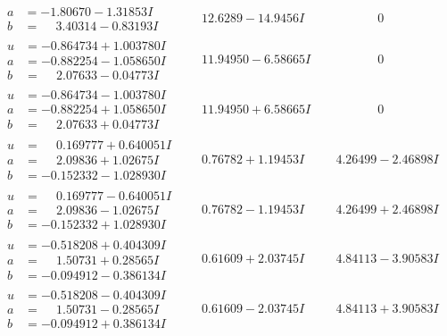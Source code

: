 \documentclass[1p]{elsarticle_modified}
\theoremstyle{definition}
\begin{document}
$$\begin{array}{c|c|c}
\begin{aligned}
a &= -1.80670 - 1.31853 I \\
b &= \phantom{-}3.40314 - 0.83193 I\end{aligned}
 & \phantom{-}12.6289 - 14.9456 I & \phantom{-0.000000 } 0 \\ \hline\begin{aligned}
u &= -0.864734 + 1.003780 I \\
a &= -0.882254 - 1.058650 I \\
b &= \phantom{-}2.07633 - 0.04773 I\end{aligned}
 & \phantom{-}11.94950 - 6.58665 I & \phantom{-0.000000 } 0 \\ \hline\begin{aligned}
u &= -0.864734 - 1.003780 I \\
a &= -0.882254 + 1.058650 I \\
b &= \phantom{-}2.07633 + 0.04773 I\end{aligned}
 & \phantom{-}11.94950 + 6.58665 I & \phantom{-0.000000 } 0 \\ \hline\begin{aligned}
u &= \phantom{-}0.169777 + 0.640051 I \\
a &= \phantom{-}2.09836 + 1.02675 I \\
b &= -0.152332 - 1.028930 I\end{aligned}
 & \phantom{-}0.76782 + 1.19453 I & \phantom{-}4.26499 - 2.46898 I \\ \hline\begin{aligned}
u &= \phantom{-}0.169777 - 0.640051 I \\
a &= \phantom{-}2.09836 - 1.02675 I \\
b &= -0.152332 + 1.028930 I\end{aligned}
 & \phantom{-}0.76782 - 1.19453 I & \phantom{-}4.26499 + 2.46898 I \\ \hline\begin{aligned}
u &= -0.518208 + 0.404309 I \\
a &= \phantom{-}1.50731 + 0.28565 I \\
b &= -0.094912 - 0.386134 I\end{aligned}
 & \phantom{-}0.61609 + 2.03745 I & \phantom{-}4.84113 - 3.90583 I \\ \hline\begin{aligned}
u &= -0.518208 - 0.404309 I \\
a &= \phantom{-}1.50731 - 0.28565 I \\
b &= -0.094912 + 0.386134 I\end{aligned}
 & \phantom{-}0.61609 - 2.03745 I & \phantom{-}4.84113 + 3.90583 I\\

\end{array}$$
\end{document}
